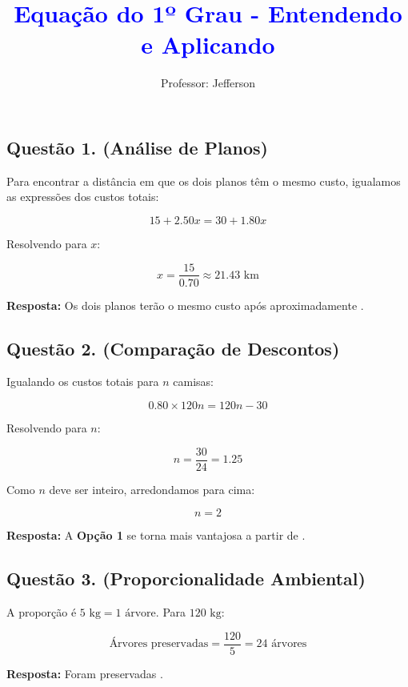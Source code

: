 \documentclass[11pt]{article}
\title{\textcolor{blue}{Equação do 1º Grau - Entendendo e Aplicando}}
\author{Professor: Jefferson}
\date{}
\begin{document}
\maketitle
\vspace{-1cm}  %


\begin{multicols}{2}

\subsection*{Questão 1. (Análise de Planos)}
Para encontrar a distância em que os dois planos têm o mesmo custo, igualamos as expressões dos custos totais:

\[
15 + 2.50x = 30 + 1.80x
\]

Resolvendo para \(x\):

\[
x = \frac{15}{0.70} \approx 21.43 \text{ km}
\]

\textbf{Resposta:} Os dois planos terão o mesmo custo após aproximadamente .



\subsection*{Questão 2. (Comparação de Descontos)}
Igualando os custos totais para \(n\) camisas:

\[
0.80 \times 120n = 120n - 30
\]

Resolvendo para \(n\):

\[
n = \frac{30}{24} = 1.25
\]

Como \(n\) deve ser inteiro, arredondamos para cima:

\[
n = 2
\]

\textbf{Resposta:} A \textbf{Opção 1} se torna mais vantajosa a partir de .



\subsection*{Questão 3. (Proporcionalidade Ambiental)}
A proporção é \(5 \text{ kg} = 1 \text{ árvore}\). Para \(120 \text{ kg}\):

\[
\text{Árvores preservadas} = \frac{120}{5} = 24 \text{ árvores}
\]

\textbf{Resposta:} Foram preservadas .




\end{multicols}
\end{document}
